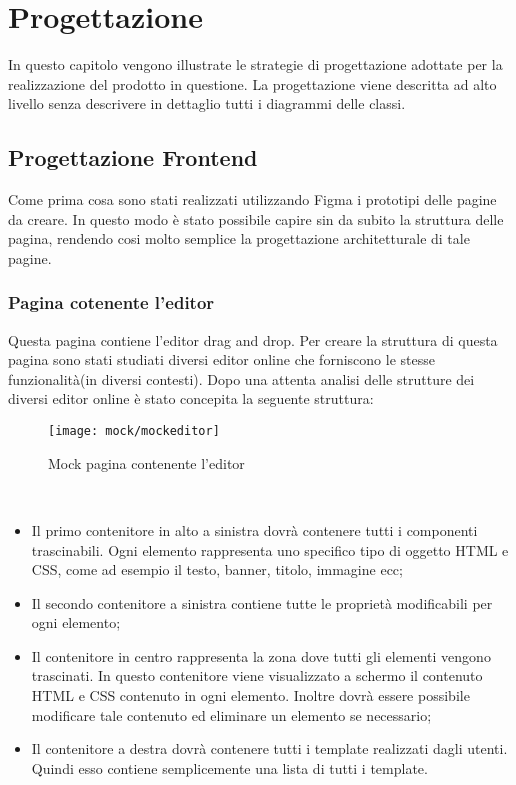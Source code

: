 
\chapter{Progettazione}
\label{cap:progettazione}
\label{sec:tecnologie-strumenti}

In questo capitolo vengono illustrate le strategie di progettazione adottate per la realizzazione del prodotto in questione. La progettazione viene descritta ad alto livello senza descrivere in dettaglio tutti i diagrammi delle classi. 

\section{Progettazione Frontend}
\label{sec:progettazione}
Come prima cosa sono stati realizzati utilizzando Figma i prototipi delle pagine da creare. In questo modo è stato possibile capire sin da subito la struttura delle pagina, rendendo cosi molto semplice la progettazione architetturale di tale pagine.
\subsection{Pagina cotenente l'editor}
Questa pagina contiene l'editor drag and drop. Per creare la struttura di questa pagina sono stati studiati diversi editor online che forniscono le stesse funzionalità(in diversi contesti). Dopo una attenta analisi delle strutture dei diversi editor online è stato concepita la seguente struttura:
\begin{figure}[!h] 
	\centering 
	\texttt{[image: mock/mockeditor]} 
	\caption{Mock pagina contenente l'editor}
\end{figure}  
\\
\begin{itemize}
	\item Il primo contenitore in alto a sinistra dovrà contenere tutti i componenti trascinabili. Ogni elemento rappresenta uno specifico tipo di oggetto HTML e CSS, come ad esempio il testo, banner, titolo, immagine ecc;
	\item Il secondo contenitore a sinistra contiene tutte le proprietà modificabili per ogni elemento;
	\item Il contenitore in centro rappresenta la zona dove tutti gli elementi vengono trascinati. In questo contenitore viene visualizzato a schermo il contenuto HTML e CSS contenuto in ogni elemento. Inoltre dovrà essere possibile modificare tale contenuto ed eliminare un elemento se necessario;
	\item Il contenitore a destra dovrà contenere tutti i template realizzati dagli utenti. Quindi esso contiene semplicemente una lista di tutti i template.  
\end{itemize}

